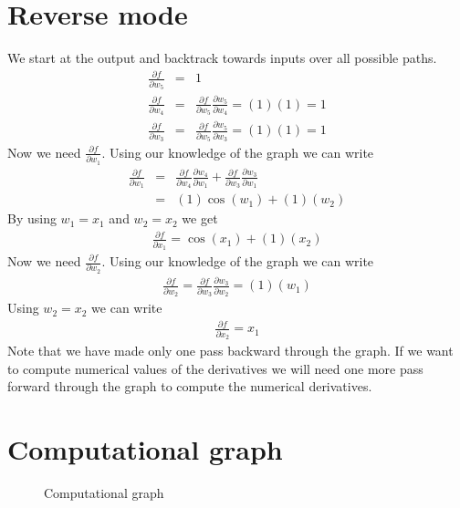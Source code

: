 \documentclass{article}
\newcommand{\ber}{\begin{eqnarray}}
\newcommand{\eer}{\end{eqnarray}}
\newcommand{\pdd}[2]{\frac{\partial{#1}}{\partial{#2}}}
\begin{document}
\section{Reverse mode}
We start at the output and backtrack towards inputs over all possible paths.
\ber
\pdd{f}{w_5} &=& 1 \\ 
\pdd{f}{w_4} &=& \pdd{f}{w_5}\pdd{w_5}{w_4} = (1)(1) = 1 \\
\pdd{f}{w_3} &=&  \pdd{f}{w_5}\pdd{w_5}{w_3} = (1)(1) = 1
\eer
Now we need $\pdd{f}{w_1}$. Using our knowledge of the graph we can write
\ber
\pdd{f}{w_1} &=& \pdd{f}{w_4}\pdd{w_4}{w_1} + \pdd{f}{w_3}\pdd{w_3}{w_1} \\
             &=& (1)\cos(w_1) + (1)(w_2)
\eer
By using $w_1=x_1$ and $w_2=x_2$ we get
\ber
\pdd{f}{x_1} = \cos(x_1) + (1)(x_2)
\eer
Now we need $\pdd{f}{w_2}$. Using our knowledge of the graph we can write
\ber
\pdd{f}{w_2} = \pdd{f}{w_3}\pdd{w_3}{w_2} = (1)(w_1)
\eer
Using $w_2=x_2$ we can write
\ber
\pdd{f}{x_2} = x_1
\eer
Note that we have made only one pass backward through the graph. If we want to compute numerical values of the derivatives we will need one more pass forward through the graph to compute the numerical derivatives. 
\section{Computational graph}
\begin{figure}
  \centering
{}
\caption{\label{fig:computationalgraph} Computational graph}
\end{figure}
\end{document}
